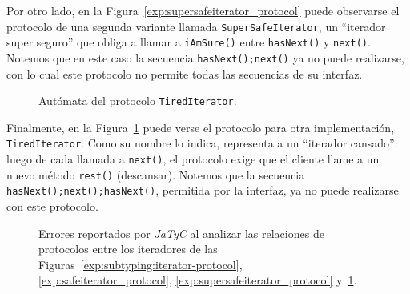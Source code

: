 Por otro lado, en la Figura~\ref{exp:supersafeiterator_protocol} puede observarse el protocolo de una segunda variante llamada \texttt{SuperSafeIterator}, un ``iterador super seguro'' que obliga a llamar a \texttt{iAmSure()} entre \texttt{hasNext()} y \texttt{next()}. Notemos que en este caso la secuencia \texttt{hasNext();next()} ya no puede realizarse, con lo cual este protocolo no permite todas las secuencias de su interfaz.

\begin{figure}[htbp]
\centering
{}
\caption{Autómata del protocolo \texttt{TiredIterator}.}
\label{exp:tirediterator_protocol}
\end{figure}

Finalmente, en la Figura~\ref{exp:tirediterator_protocol} puede verse el protocolo para otra implementación, \texttt{TiredIterator}. Como su nombre lo indica, representa a un ``iterador cansado'': luego de cada llamada a \texttt{next()}, el protocolo exige que el cliente llame a un nuevo método \texttt{rest()} (descansar). Notemos que la secuencia \texttt{hasNext();next();hasNext()}, permitida por la interfaz, ya no puede realizarse con este protocolo.

\begin{figure}[htbp]
    \centering
    
    \caption{Errores reportados por \textit{JaTyC} al analizar las relaciones de protocolos entre los iteradores de las Figuras~\ref{exp:subtyping:iterator-protocol}, \ref{exp:safeiterator_protocol}, \ref{exp:supersafeiterator_protocol} y~\ref{exp:tirediterator_protocol}.}
    \label{exp:subtyping:error}
\end{figure}

